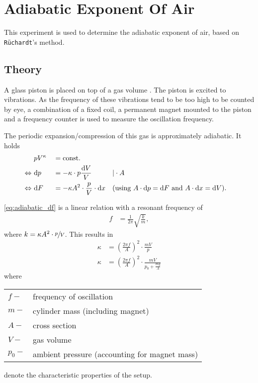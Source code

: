 \chapter{Adiabatic Exponent Of Air}
This experiment is used to determine the adiabatic exponent of air, based on \texttt{Rüchardt}'s method.

\section{Theory}
A glass piston is placed on top of a gas volume .
The piston is excited to vibrations.
As the frequency of these vibrations tend to be too high to be counted by eye, a combination of a fixed coil, a permanent magnet mounted to the piston and a frequency counter is used to measure the oscillation frequency.

The periodic expansion/compression of this gas is approximately adiabatic. It holds
\begin{align}
	&pV^{\kappa} &&= \text{const.}& \nonumber \\
	\Leftrightarrow\ &\text{d} p &&= -\kappa\cdot p\frac{\text{d} V}{V}&&|\cdot A \nonumber \\
	\Leftrightarrow\ &\text{d} F &&= -\kappa A^2\cdot\frac{p}{V}\cdot\text{d} x &&\text{(using $A\cdot \text{d} p=\text{d} F$ and $A\cdot\text{d} x=\text{d} V$).} \label{eq:adiabatic_df}
\end{align}

\autoref{eq:adiabatic_df} is a linear relation with a resonant frequency of
\begin{align*}
	f&=\frac{1}{2\pi}\sqrt{\frac{k}{m}},
\end{align*}
where $k=\kappa A^2\cdot\sfrac{p}{V}$.
This results in
\begin{align}\label{eq:kappa}
	\kappa&=\left(\frac{2\pi f}{A}\right)^2\cdot\frac{mV}{p} \nonumber \\
	\kappa&=\left(\frac{2\pi f}{A}\right)^2\cdot\frac{mV}{p_0+\frac{mg}{A}}
\end{align}
where\par
\begin{tabular}{ll}
	$f-$	&	frequency of oscillation \\
	$m-$	&	cylinder mass (including magnet) \\
	$A-$	&	cross section \\
	$V-$	&	gas volume \\
	$p_0-$	&	ambient pressure (accounting for magnet mass)\\
\end{tabular}\par
denote the characteristic properties of the setup.


